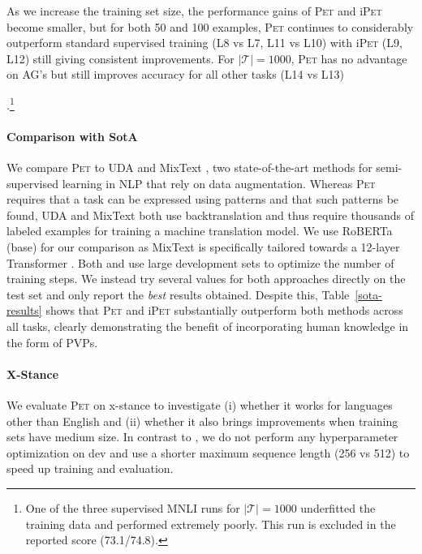 As we increase the training set size, the performance gains of \textsc{Pet} and i\textsc{Pet} become smaller, but for both 50 and 100 examples, \textsc{Pet} continues to considerably outperform standard supervised training (L8 vs L7, L11 vs L10) with i\textsc{Pet} (L9, L12) still giving consistent improvements. For $|\mathcal{T}| = 1000$,
\textsc{Pet} 
has no advantage on AG's  but still improves accuracy for all other tasks (L14 vs L13)

.\footnote{One of the three supervised MNLI runs for $|\mathcal{T}|=1000$ underfitted the training data and performed extremely poorly. This run is excluded in the reported score (73.1/74.8).}

\paragraph{Comparison with SotA}

We compare \textsc{Pet} to UDA \citep{xie2019unsupervised} and MixText \citep{chen2020mixtext}, two state-of-the-art methods for semi-supervised learning in NLP that rely on data augmentation. Whereas \textsc{Pet} requires that a task can be expressed using patterns and that such patterns be found, UDA and MixText both use backtranslation \citep{sennrich-etal-2016-improving} and thus require thousands of labeled examples for training a machine translation model. We use RoBERTa (base) for our comparison as MixText is specifically tailored towards a 12-layer Transformer \citep{Vaswani2017}. Both \citet{xie2019unsupervised} and \citet{chen2020mixtext} use large development sets to optimize the number of training steps. We instead try several values for both approaches directly on the test set and only report the \emph{best} results obtained. Despite this, Table~\ref{sota-results} shows that \textsc{Pet} and i\textsc{Pet} substantially outperform both methods across all tasks, clearly demonstrating the benefit of incorporating human knowledge in the form of PVPs. 

\paragraph{X-Stance} We evaluate \textsc{Pet} on x-stance to investigate (i) whether it works for languages other than English and (ii) whether it also brings improvements when training sets have medium size. In contrast to  \citet{vamvas2020xstance}, we do not perform any hyperparameter optimization on  dev and use a shorter maximum sequence length (256 vs 512) to speed up training and evaluation. 

